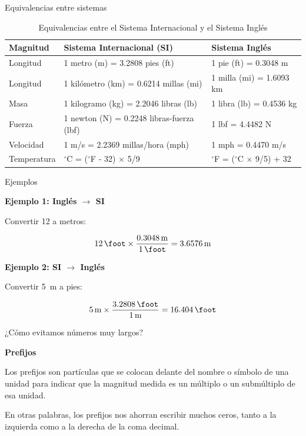 \begin{frame}{Equivalencias entre sistemas}
\footnotesize
    \begin{table}[h]
\centering
\caption{Equivalencias entre el Sistema Internacional y el Sistema Inglés}
\begin{tabular}{|l|l|l|}
\hline
\textbf{Magnitud} & \textbf{Sistema Internacional (SI)} & \textbf{Sistema Inglés} \\ \hline
Longitud & 1 metro (m) = 3.2808 pies (ft) & 1 pie (ft) = 0.3048 m \\ \hline
Longitud & 1 kilómetro (km) = 0.6214 millas (mi) & 1 milla (mi) = 1.6093 km \\ \hline
Masa & 1 kilogramo (kg) = 2.2046 libras (lb) & 1 libra (lb) = 0.4536 kg \\ \hline
Fuerza & 1 newton (N) = 0.2248 libras-fuerza (lbf) & 1 lbf = 4.4482 N \\ \hline
Velocidad & 1 m/s = 2.2369 millas/hora (mph) & 1 mph = 0.4470 m/s \\ \hline
Temperatura & $^\circ$C = ($^\circ$F - 32) × 5/9 & $^\circ$F = ($^\circ$C × 9/5) + 32 \\ \hline
\end{tabular}
\end{table}

\end{frame}

\begin{frame}{Ejemplos}

\textbf{Ejemplo 1: Inglés $\rightarrow$ SI}  

Convertir \SI{12}{\foot} a metros:

\[
\SI{12}{\foot} \times \frac{\SI{0.3048}{\metre}}{\SI{1}{\foot}} 
= \SI{3.6576}{\metre}
\]

\textbf{Ejemplo 2: SI $\rightarrow$ Inglés}  

Convertir \SI{5}{\metre} a pies:

\[
\SI{5}{\metre} \times \frac{\SI{3.2808}{\foot}}{\SI{1}{\metre}} 
= \SI{16.404}{\foot}
\]
\end{frame}

\begin{frame}{¿Cómo evitamos números muy largos?}

\textbf{Prefijos}

    Los prefijos son partículas que se colocan delante del nombre o símbolo de una unidad para indicar que la magnitud medida es un múltiplo o un submúltiplo de esa unidad.

En otras palabras, los prefijos nos ahorran escribir muchos ceros, tanto a la izquierda como a la derecha de la coma decimal.
\end{frame}

